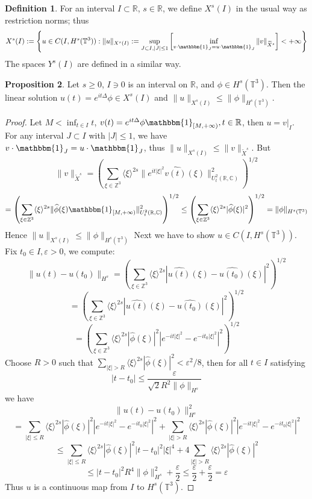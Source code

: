 \documentclass{article}
\theoremstyle{definition}
\newtheorem{definition}{Definition}[subsection]
\newtheorem{proposition}[definition]{Proposition}
\theoremstyle{remark}
\begin{document}
\begin{definition}
For an interval $I\subset\mathbb{R}$, $s\in\mathbb{R}$, we define $X^s(I)$ in the usual way as restriction norms; thus
$$X^s(I):=\left\lbrace u\in C(I,H^s(\mathbb{T}^3)):\|u\|_{X^s(I)}:=\sup_{J\subset I,|J|\le1}\left[\inf_{v\cdot\mathbbm{1}_J=u\cdot\mathbbm{1}_J}\|v\|_{\widetilde{X}^s}\right]<+\infty\right\rbrace$$
The spaces $Y^s(I)$ are defined in a similar way. 
\end{definition}

\begin{proposition}
Let $s\ge0$, $I\ni0$ is an interval on $\mathbb{R}$, and $\phi\in H^s(\mathbb{T}^3)$. Then the linear solution $u(t)=e^{it\Delta}\phi\in X^s(I)$ and $\|u\|_{X^s(I)}\le\|\phi\|_{H^s(\mathbb{T}^3)}$. 
\end{proposition}
\begin{proof}
Let $M<\inf_{t\in I}t$, $v(t)=e^{it\Delta}\phi\mathbbm{1}_{[M,+\infty)}, t\in\mathbb{R}$, then $u=v|_I$. For any interval $J\subset I$ with $|J|\le1$, we have $v\cdot\mathbbm{1}_J=u\cdot\mathbbm{1}_J$, thus $\|u\|_{X^s(I)}\le\|v\|_{\widetilde{X}^s}$. But 
$$\|v\|_{\widetilde{X}^s}=\left(\sum_{\xi\in\mathbb{Z}^3}\langle\xi\rangle^{2s}\|e^{it|\xi|^2}\widehat{v(t)}(\xi)\|^2_{U_t^2(\mathbb{R},\mathbb{C})}\right)^{1/2}$$
$$=\left(\sum_{\xi\in\mathbb{Z}^3}\langle\xi\rangle^{2s}\|\widehat{\phi}(\xi)\mathbbm{1}_{[M,+\infty)}\|^2_{U_t^2(\mathbb{R},\mathbb{C})}\right)^{1/2}\le\left(\sum_{\xi\in\mathbb{Z}^3}\langle\xi\rangle^{2s}|\widehat{\phi}(\xi)|^2\right)^{1/2}=\|\phi\|_{H^s(\mathbb{T}^3)}$$
Hence $\|u\|_{X^s(I)}\le\|\phi\|_{H^s(\mathbb{T}^3)}$
Next we have to show $u\in C(I,H^s(\mathbb{T}^3))$. Fix $t_0\in I,\varepsilon>0$, we compute: 
$$\|u(t)-u(t_0)\|_{H^s}=\left(\sum_{\xi\in\mathbb{Z}^3}\langle\xi\rangle^{2s}|\widehat{u(t)}(\xi)-\widehat{u(t_0)}(\xi)|^2\right)^{1/2}$$
$$=\left(\sum_{\xi\in\mathbb{Z}^3}\langle\xi\rangle^{2s}|\widehat{u(t)}(\xi)-\widehat{u(t_0)}(\xi)|^2\right)^{1/2}$$
$$=\left(\sum_{\xi\in\mathbb{Z}^3}\langle\xi\rangle^{2s}|\widehat{\phi}(\xi)|^2\left|e^{-it|\xi|^2}-e^{-it_0|\xi|^2}\right|^2\right)^{1/2}$$
Choose $R>0$ such that $\sum_{|\xi|>R}\langle\xi\rangle^{2s}|\widehat{\phi}(\xi)|^2<\varepsilon^2/8$, then for all $t\in I$ satisfying 
$$|t-t_0|\le\frac{\varepsilon}{\sqrt{2}R^2\|\phi\|_{H^s}}$$
we have 
$$\|u(t)-u(t_0)\|_{H^s}^2$$
$$=\sum_{|\xi|\le R}\langle\xi\rangle^{2s}|\widehat{\phi}(\xi)|^2\left|e^{-it|\xi|^2}-e^{-it_0|\xi|^2}\right|^2+\sum_{|\xi|> R}\langle\xi\rangle^{2s}|\widehat{\phi}(\xi)|^2\left|e^{-it|\xi|^2}-e^{-it_0|\xi|^2}\right|^2$$
$$\le\sum_{|\xi|\le R}\langle\xi\rangle^{2s}|\widehat{\phi}(\xi)|^2|t-t_0|^2|\xi|^4+4\sum_{|\xi|> R}\langle\xi\rangle^{2s}|\widehat{\phi}(\xi)|^2$$
$$\le|t-t_0|^2R^4\|\phi\|_{H^s}^2+\frac{\varepsilon}{2}\le\frac{\varepsilon}{2}+\frac{\varepsilon}{2}=\varepsilon$$
Thus $u$ is a continuous map from $I$ to $H^s(\mathbb{T}^3)$. 
\end{proof}
\end{document}
